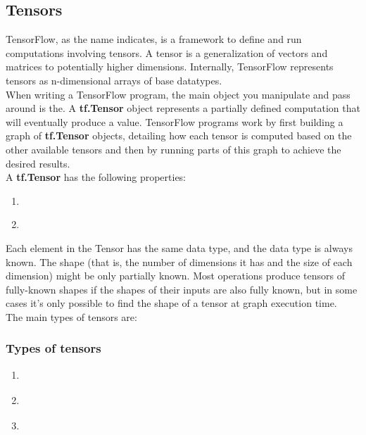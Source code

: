     \subsection{Tensors}
    TensorFlow, as the name indicates, is a framework to define and run computations involving tensors. A tensor is a generalization of vectors and matrices to potentially higher dimensions. Internally, TensorFlow represents tensors as n-dimensional arrays of base datatypes.\\
    When writing a TensorFlow program, the main object you manipulate and pass around is the. A \textbf{tf.Tensor} object represents a partially defined computation that will eventually produce a value. TensorFlow programs work by first building a graph of \textbf{tf.Tensor} objects, detailing how each tensor is computed based on the other available tensors and then by running parts of this graph to achieve the desired results.\\
    A \textbf{tf.Tensor} has the following properties:
    \begin{enumerate}
      \item\textcite{a data type (float32, int32, or string, for example)}
      \item\textcite{a shape}
      \end{enumerate}
      Each element in the Tensor has the same data type, and the data type is always known. The shape (that is, the number of dimensions it has and the size of each dimension) might be only partially known. Most operations produce tensors of fully-known shapes if the shapes of their inputs are also fully known, but in some cases it's only possible to find the shape of a tensor at graph execution time.\\
      The main types of tensors are:
    \subsubsection{Types of tensors}
      \begin{enumerate}
    \item\textcite{tf.Variable}
    \item\textcite{tf.constant}
    \item\textcite{tf.placeholder}
    \end{enumerate}

